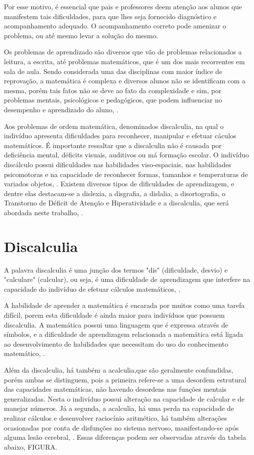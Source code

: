 \documentclass[
	12pt,				%
    oneside,			%
	a4paper,			%
	english,			%
	french,				%
	spanish,			%
	brazil,				%
	]{abntex2}
\begin{document}
Por esse motivo, é essencial que pais e professores deem atenção aos alunos que manifestem tais dificuldades, para que lhes seja fornecido diagnóstico e  acompanhamento adequado. O acompanhamento correto pode amenizar o problema, ou até mesmo levar a solução do mesmo.

Os problemas de aprendizado são diversos que vão de problemas relacionados a leitura, a escrita, até problemas matemáticos, que é um dos mais recorrentes em sala de aula. Sendo considerada uma das disciplinas com maior índice de reprovação, a matemática é complexa e diversos alunos não se identificam com a mesma, porém tais fatos não se deve ao fato da complexidade e sim, por problemas mentais, psicológicos e pedagógicos, que podem influenciar no desempenho e aprendizado do aluno, \cite{Almeida}.

Aos problemas de ordem matemática, denominados discalculia, na qual o indivíduo apresenta dificuldades para reconhecer, manipular e efetuar cáculos matemáticos. É importante ressaltar que a discalculia não é causada por deficiência mental, déficits visuais, auditivos ou má formação escolar. O indivíduo discálculo possui dificuldades nas habilidades viso-espaciais, nas habilidades psicomotoras e na capacidade de reconhecer formas, tamanhos e temperaturas de variados objetos, \cite{Almeida}.
Existem diversos tipos de dificuldades de aprendizagem, e dentre elas destacam-se a dislexia, a disgrafia, a dislalia, a disortografia, o Transtorno de Déficit de Atenção e Hiperatividade e a discalculia, que será abordada neste trabalho, \cite{Barros}.


\section{Discalculia}
A palavra discalculia é uma junção dos termos "dis" (dificuldade, desvio) e "calculare" (calcular), ou seja, é uma dificuldade de aprendizagem que interfere na capacidade do indivíduo de efetuar cálculos matemáticos, \cite{Santos}.

A habilidade de aprender a matemática é encarada por muitos como  uma tarefa difícil, porem esta dificuldade é ainda maior para indivíduos que possuem discalculia. A matemática possui uma linguagem que é expressa através de símbolos, e a dificuldade de aprendizagem relacionada a matemática está ligada ao desenvolvimento de habilidades que necessitam do uso do conhecimento matemático, \cite{Araman}.

Além da discalculia, há também a acalculia,que são geralmente confundidas, porém ambas se distinguem, pois a primeira refere-se a uma desordem estrutural das capacidades matemáticas, não havendo desordens nas funções mentais generalizadas. Nesta o indivíduo possui alteração na capacidade de calcular e de manejar números. Já a segunda, a acalculia, há uma perda na capacidade de realizar cálculos e desenvolver raciocínio aritmético, há também alterações ocasionadas por conta de disfunções no sistema nervoso, manifestando-se após alguma lesão cerebral, \cite{Santos}. Essas diferenças podem ser observadas através da tabela abaixo, FIGURA.
\end{document}
